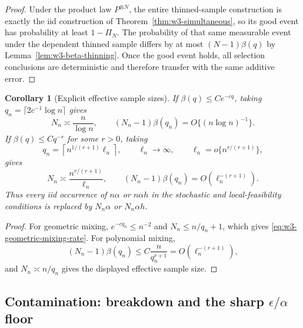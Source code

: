 \documentclass[11pt]{article}
\newtheorem{corollary}[theorem]{Corollary}
\theoremstyle{remark}
\begin{document}
\begin{proof}
Under the product law $P^{\otimes N}$, the entire thinned-sample construction
is exactly the iid construction of Theorem~\ref{thm:w3-simultaneous}, so its
good event has probability at least $1-\Pi_N$.  The probability of that same
measurable event under the dependent thinned sample differs by at most
$(N-1)\beta(q)$ by Lemma~\ref{lem:w3-beta-thinning}.  Once the good event holds,
all selection conclusions are deterministic and therefore transfer with the
same additive error.
\end{proof}

\begin{corollary}[Explicit effective sample sizes]
\label{cor:w3-beta-rates}
If $\beta(q)\le C e^{-cq}$, taking
$q_n=\lceil2c^{-1}\log n\rceil$ gives
\begin{equation}
 N_n\asymp\frac{n}{\log n},
 \qquad
 (N_n-1)\beta(q_n)=O\{(n\log n)^{-1}\}.
 \label{eq:w3-geometric-mixing-rate}
\end{equation}
If $\beta(q)\le Cq^{-r}$ for some $r>0$, taking
\begin{equation}
 q_n=\left\lceil n^{1/(r+1)}\ell_n\right\rceil,
 \qquad \ell_n\longrightarrow\infty,
 \qquad \ell_n=o\{n^{r/(r+1)}\},
 \label{eq:w3-polynomial-spacing}
\end{equation}
gives
\begin{equation}
 N_n\asymp\frac{n^{r/(r+1)}}{\ell_n},
 \qquad
 (N_n-1)\beta(q_n)=O(\ell_n^{-(r+1)}).
 \label{eq:w3-polynomial-mixing-rate}
\end{equation}
Thus every iid occurrence of $n\alpha$ or $n\alpha h$ in the stochastic and
local-feasibility conditions is replaced by $N_n\alpha$ or $N_n\alpha h$.
\end{corollary}

\begin{proof}
For geometric mixing, $e^{-cq_n}\le n^{-2}$ and
$N_n\le n/q_n+1$, which gives \eqref{eq:w3-geometric-mixing-rate}.  For
polynomial mixing,
\begin{equation*}
 (N_n-1)\beta(q_n)
 \le C\frac{n}{q_n^{r+1}}
 =O(\ell_n^{-(r+1)}),
\end{equation*}
and $N_n\asymp n/q_n$ gives the displayed effective sample size.
\end{proof}

\subsection{Contamination: breakdown and the sharp $\epsilon/\alpha$ floor}
\end{document}
